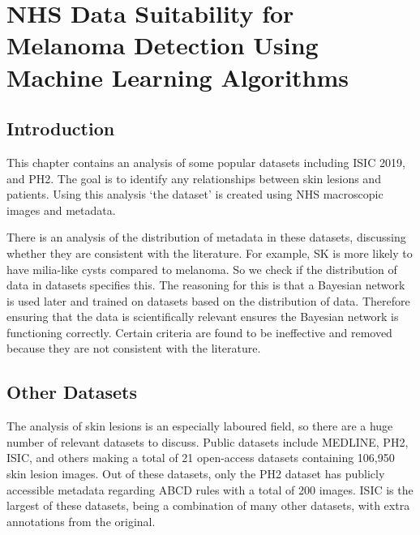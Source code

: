\chapter{NHS Data Suitability for Melanoma Detection Using Machine Learning Algorithms}

\section{Introduction}
This chapter contains an analysis of some popular datasets including ISIC 2019, and PH2. The goal is to identify any relationships between skin lesions and patients. Using this analysis `the dataset' is created using NHS macroscopic images and metadata.

There is an analysis of the distribution of metadata in these datasets, discussing whether they are consistent with the literature. For example, SK is more likely to have milia-like cysts compared to melanoma. So we check if the distribution of data in datasets specifies this. The reasoning for this is that a Bayesian network is used later and trained on datasets based on the distribution of data. Therefore ensuring that the data is scientifically relevant ensures the Bayesian network is functioning correctly. Certain criteria are found to be ineffective and removed because they are not consistent with the literature.

\section{Other Datasets}
The analysis of skin lesions is an especially laboured field, so there are a huge number of relevant datasets to discuss. Public datasets include MEDLINE, PH2, ISIC, and others making a total of 21 open-access datasets containing 106,950 skin lesion images\cite{Wen2022}. Out of these datasets, only the PH2 dataset has publicly accessible metadata regarding ABCD rules with a total of 200 images. ISIC is the largest of these datasets, being a combination of many other datasets, with extra annotations from the original.

